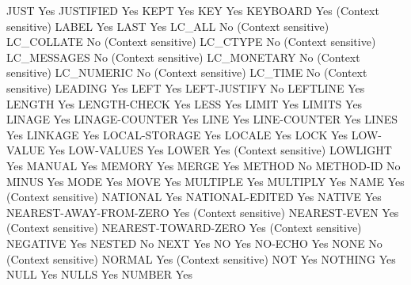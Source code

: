 JUST                            Yes
JUSTIFIED                       Yes
KEPT                            Yes
KEY                             Yes
KEYBOARD                        Yes (Context sensitive)
LABEL                           Yes
LAST                            Yes
LC_ALL                          No (Context sensitive)
LC_COLLATE                      No (Context sensitive)
LC_CTYPE                        No (Context sensitive)
LC_MESSAGES                     No (Context sensitive)
LC_MONETARY                     No (Context sensitive)
LC_NUMERIC                      No (Context sensitive)
LC_TIME                         No (Context sensitive)
LEADING                         Yes
LEFT                            Yes
LEFT-JUSTIFY                    No
LEFTLINE                        Yes
LENGTH                          Yes
LENGTH-CHECK                    Yes
LESS                            Yes
LIMIT                           Yes
LIMITS                          Yes
LINAGE                          Yes
LINAGE-COUNTER                  Yes
LINE                            Yes
LINE-COUNTER                    Yes
LINES                           Yes
LINKAGE                         Yes
LOCAL-STORAGE                   Yes
LOCALE                          Yes
LOCK                            Yes
LOW-VALUE                       Yes
LOW-VALUES                      Yes
LOWER                           Yes (Context sensitive)
LOWLIGHT                        Yes
MANUAL                          Yes
MEMORY                          Yes
MERGE                           Yes
METHOD                          No
METHOD-ID                       No
MINUS                           Yes
MODE                            Yes
MOVE                            Yes
MULTIPLE                        Yes
MULTIPLY                        Yes
NAME                            Yes (Context sensitive)
NATIONAL                        Yes
NATIONAL-EDITED                 Yes
NATIVE                          Yes
NEAREST-AWAY-FROM-ZERO          Yes (Context sensitive)
NEAREST-EVEN                    Yes (Context sensitive)
NEAREST-TOWARD-ZERO             Yes (Context sensitive)
NEGATIVE                        Yes
NESTED                          No
NEXT                            Yes
NO                              Yes
NO-ECHO                         Yes
NONE                            No (Context sensitive)
NORMAL                          Yes (Context sensitive)
NOT                             Yes
NOTHING                         Yes
NULL                            Yes
NULLS                           Yes
NUMBER                          Yes
